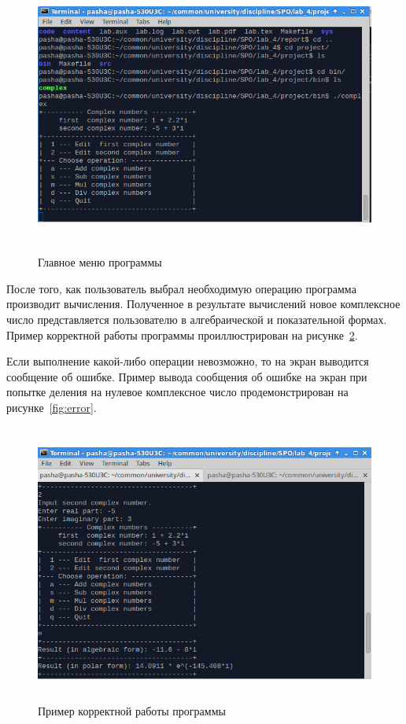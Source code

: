 \begin{figure}[htbp]
  \centering
  \includegraphics[width=150mm,height=92mm]{img/menu}
  \caption{Главное меню программы}\label{fig:menu}
\end{figure}

После того, как пользователь выбрал необходимую операцию программа производит вычисления. Полученное в результате вычислений новое комплексное число представляется пользователю в алгебраической и показательной формах. Пример корректной работы программы проиллюстрирован на рисунке~\ref{fig:correct}.

Если выполнение какой-либо операции невозможно, то на экран выводится сообщение об ошибке. Пример вывода сообщения об ошибке на экран при попытке деления на нулевое комплексное число продемонстрирован на рисунке~\ref{fig:error}.

\begin{figure}[htbp]
  \centering
  \includegraphics[width=150mm,height=92mm]{img/correct}
  \caption{Пример корректной работы программы}\label{fig:correct}
\end{figure}

